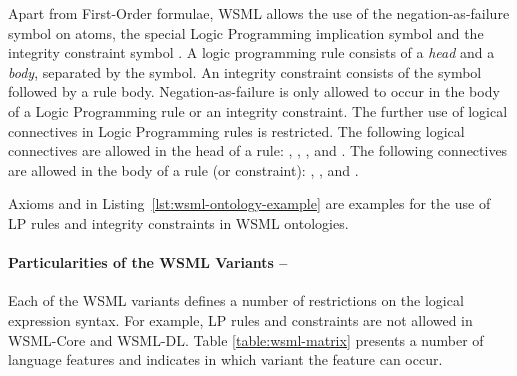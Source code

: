 Apart from First-Order formulae, WSML allows the use of the
negation-as-failure symbol  on atoms, the special Logic
Programming implication symbol \synkw{:-} and the integrity
constraint symbol \synkw{!-}. A logic programming rule consists of a
\emph{head} and a \emph{body}, separated by the \synkw{:-} symbol.
An integrity constraint consists of the symbol \synkw{!-} followed
by a rule body. Negation-as-failure  is only allowed to
occur in the body of a Logic Programming rule or an integrity
constraint. The further use of logical connectives in Logic
Programming rules is restricted. The following logical connectives
are allowed in the head of a rule: , ,
, and . The following connectives
are allowed in the body of a rule (or constraint): ,
, and .
%

Axioms  and
 in Listing~\ref{lst:wsml-ontology-example}
are examples for the use of LP rules and integrity constraints in
WSML ontologies.

\paragraph{\small Particularities of the WSML Variants --}
Each of the WSML variants defines a number of restrictions on the
logical expression syntax. For example, LP rules and constraints
are not allowed in WSML-Core and WSML-DL. Table
\ref{table:wsml-matrix} presents a number of language features and
indicates in which variant the feature can occur.

